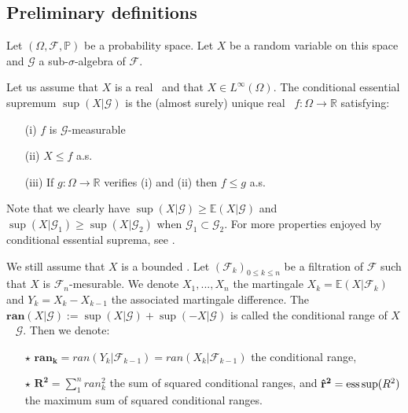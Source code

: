 \subsection{Preliminary definitions}
Let $(\Omega,\mathcal{F},\mathbb{P})$ be a probability space.
Let $X$ be a random variable on this space and $\mathcal{G}$ a sub-$\sigma$-algebra of $\mathcal{F}$.

\begin{notation} Let us assume that $X$ is a real \rv~and that $X \in L^{\infty}(\Omega)$. The conditional essential supremum $\sup(X|\mathcal{G})$ is the (almost surely) unique real \rv~$f:\Omega \rightarrow \mathbb{R}$ satisfying:
\begin{itemize}
\item[(i)] $f$ is $\mathcal{G}$-measurable
\item[(ii)] $X \leq f$ a.s.
\item[(iii)] If  $g:\Omega \rightarrow \mathbb{R}$ verifies (i) and (ii) then $ f\le g$ a.s.
\end{itemize}
\end{notation}
%
Note that we clearly have $\sup(X|\mathcal{G}) \geq \mathbb{E}(X|\mathcal{G}) $ and  $\sup(X|\mathcal{G}_1) \geq  \sup(X|\mathcal{G}_2) $ when  $ \mathcal{G}_1 \subset \mathcal{G}_2$.
For more properties enjoyed by conditional essential suprema, see \cite{Barron2003}.

\begin{notation}
\label{defpreli1}
We still assume that $X$ is a bounded \rv. Let $(\mathcal{F}_k)_{0\leq k \leq n}$ be a filtration of $\mathcal{F}$ such that $X$ is $\mathcal{F}_n$-mesurable. We denote $X_1,...,X_n$ the martingale $X_k=\mathbb{E}(X|\mathcal{F}_k)$ and $Y_k=X_k - X_{k-1}$ the associated martingale difference. The \rv~$\mathbf{ran}(X \vert \mathcal{G}) := \sup(X | \mathcal{G}) + \sup(-X \vert \mathcal{G}) $ is called the conditional range of $X$ \wrt~ $\mathcal{G}$. Then we denote:
\begin{itemize}
\item [$\star$] $ \mathbf{ran_k} = ran (Y_k|\mathcal{F}_{k-1}) = ran(X_k|\mathcal{F}_{k-1})$ the conditional range,
\item [$\star$] $\mathbf{R^2} = \sum_{1}^{n} ran_k^2$  the sum of squared conditional ranges, and $\mathbf{\hat{r}^2} = \supess(R^2)$ the maximum sum of squared conditional ranges.
\end{itemize}
\end{notation}

